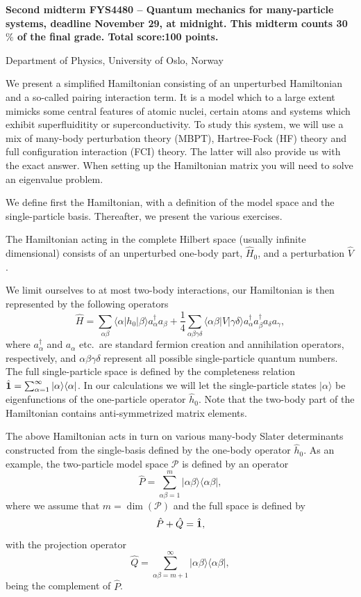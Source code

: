 \documentclass[prc]{revtex4} \usepackage[dvips]{graphicx}
\begin{document}
\begin{center}
{\LARGE\bf
Second midterm FYS4480 – Quantum mechanics for many-particle systems, deadline November 29, at midnight. This midterm counts 30$\%$ of the final grade. Total score:100 points.}
\end{center}
\begin{center}
\centerline{{\small Department of Physics, University of Oslo, Norway}}
\end{center}


We present a simplified Hamiltonian consisting of an unperturbed
Hamiltonian and a so-called pairing interaction term. It is a model
which to a large extent mimicks some central features of atomic
nuclei, certain atoms and systems which exhibit superfluiditity or
superconductivity.  To study this system, we will use a mix of
many-body perturbation theory (MBPT), Hartree-Fock (HF) theory and full
configuration interaction (FCI) theory. The latter will also provide us with
the exact answer.  When setting up the Hamiltonian matrix you will
need to solve an eigenvalue problem.

We define first the Hamiltonian, with a definition of the model space
and the single-particle basis. Thereafter, we present the various
exercises.


The Hamiltonian acting in the complete Hilbert space (usually infinite
dimensional) consists of an unperturbed one-body part, $\hat{H}_0$,
and a perturbation $\hat{V}$.

We limit ourselves to at most two-body interactions, our Hamiltonian
is then represented by the following operators
\[
\hat{H} = \sum_{\alpha\beta}\langle \alpha |h_0|\beta\rangle
a_{\alpha}^{\dagger}a_{\beta}
+\frac{1}{4}\sum_{\alpha\beta\gamma\delta}\langle \alpha\beta|
V|\gamma\delta\rangle
a_{\alpha}^{\dagger}a_{\beta}^{\dagger}a_{\delta}a_{\gamma},
\]
where $a_{\alpha}^{\dagger}$ and $a_{\alpha}$ etc.~are standard
fermion creation and annihilation operators, respectively, and
$\alpha\beta\gamma\delta$ represent all possible single-particle
quantum numbers.  The full single-particle space is defined by the
completeness relation $\hat{{\bf 1}} = \sum_{\alpha
  =1}^{\infty}|\alpha \rangle \langle \alpha|$.  In our calculations
we will let the single-particle states $|\alpha\rangle$ be
eigenfunctions of the one-particle operator $\hat{h}_0$. Note that the two-body part of the Hamiltonian 
contains anti-symmetrized matrix elements.


The above Hamiltonian acts in turn on various many-body Slater
determinants constructed from the single-basis defined by the one-body
operator $\hat{h}_0$.  As an example, the two-particle model space
$\mathcal{P}$ is defined by an operator
\[
\hat{P} = \sum_{\alpha\beta =1}^{m}|\alpha\beta \rangle \langle
\alpha\beta|,
\]
where we assume that $m=\dim(\mathcal{P})$ and the full space is
defined by
\[
\hat{P}+\hat{Q}=\hat{{\bf 1}},
\]
with the projection operator
\[
\hat{Q} = \sum_{\alpha\beta =m+1}^{\infty}|\alpha\beta \rangle \langle
\alpha\beta|,
\]
being the complement of $\hat{P}$.
\end{document}
